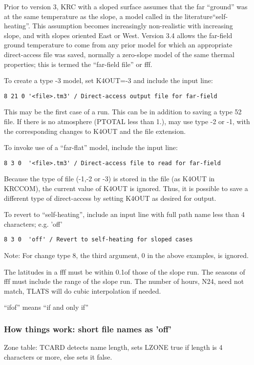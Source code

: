 

Prior to version 3, KRC with a sloped surface assumes that the far ``ground''
was at the same temperature as the slope, a model called in the
literature``self-heating''. This assumption becomes increasingly non-realistic
with increasing slope, and with slopes oriented East or West. Version 3.4 allows
the far-field ground temperature to come from any prior model for which an
appropriate direct-access file was saved, normally a zero-slope model of the
same thermal properties; this is termed the ``far-field file'' or fff.

To create a type -3 model, set K4OUT=-3 and include the input line:
\vspace{-3.mm}
\begin{verbatim}
8 21 0 '<file>.tm3' / Direct-access output file for far-field
\end{verbatim}
This may be the first case of a run. This can be in addition to saving a type 52
file. If there is no atmosphere (PTOTAL less than 1.), may use type -2 or -1,
with the corresponding changes to K4OUT and the file extension.

To invoke use of a ``far-flat'' model, include the input line:
\vspace{-3.mm}
\begin{verbatim}
8 3 0  '<file>.tm3' / Direct-access file to read for far-field
\end{verbatim}
Because the type of file (-1,-2 or -3) is stored in the file (as K4OUT in
KRCCOM), the current value of K4OUT is ignored. Thus, it is possible to save a
different type of direct-access by setting K4OUT as desired for output.

To revert to ``self-heating'', include an input line with full path name less than 4 characters; e.g. 'off'
\vspace{-3.mm}
\begin{verbatim}
8 3 0  'off' / Revert to self-heating for sloped cases
\end{verbatim}

Note: For change type 8, the third argument, 0 in the above examples, is ignored.

The latitudes in a fff must be within 0.1\qd of those of the slope run. The
seasons of fff must include the range of the slope run. The number of hours,
N24, need not match, TLATS will do cubic interpolation if needed.

``ifof'' means ``if and only if''

\subsubsection{How things work:  short file names as 'off'}
Zone table: TCARD detects name length, sets LZONE true if length is 4 characters or more, else sets it false.

